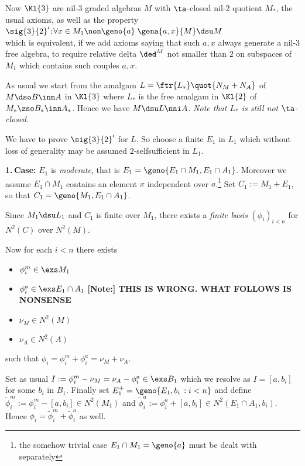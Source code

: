 Now $\Kl{3}$ are nil-$3$ graded algebras $M$ with $\ta$-closed nil-$2$ quotient $M_{*}$,
the usual axioms, as well as the property\\[+1mm]
$\sig{3}{2}^{\prime}$:\quad $\forall x\in M_{1}\non\geno{a}\;\gena{a,x}{M}\dsu M$\\[+2mm]
which is equivalent, if we add axioms saying that such $a,x$ always generate
a nil-$3$ free algebra, to require relative delta $\ded^{M}$ not smaller than $2$ on subspaces of $M_{1}$ which contains such couples $a,x$.

\medskip
As usual we start from the amalgam $L=\ftr{L_{*}}\quot {N_{M}+N_{A}}$ of $M\dso B\inn A$
in $\Kl{3}$ where $L_{*}$ is the free amalgam in $\Kl{2}$ of $M_{*}\zso B_{*}\inn A_{*}$.
Hence we have $M\dsu L \nni A$. {\em Note that $L_{*}$ is still not $\ta$-closed.}

\medskip
We have to prove $\sig{3}{2}^{\prime}$ for $L$. So choose a finite $E_{1}$ in $L_{1}$ which
without loss of generality may be assumed $2$-selfsufficient in $L_{1}$.

\smallskip
{\bf 1.{\,}Case:} $E_{1}$ is {\em moderate}, that is $E_{1}=\geno{E_{1}\cap M_{1},E_{1}\cap A_{1}}$. Moreover we assume $E_{1}\cap M_{1}$ contains an element $x$ independent
over $a$.\footnote{the somehow trivial case $E_{1}\cap M_{1}=\geno{a}$ must be dealt with separately}
Set $C_{1}:=M_{1}+E_{1}$, so that $C_{1}=\geno{M_{1},E_{1}\cap A_{1}}$.

Since $M_{1}\dsu L_{1}$ and $C_{1}$ is finite over $M_{1}$, there exists a {\em finite basis}
$(\phi_{i})_{i<n}$ for $N^{2}(C)$ over $N^{2}(M)$.

Now for each $i<n$ there exists
\begin{itemize}
\item $\phi^{m}_{i}\in\exs M_{1}$
\item $\phi^{a}_{i}\in\exs E_{1}\cap A_{1}$ {\bf [Note:] THIS IS WRONG. WHAT FOLLOWS IS NONSENSE}
\item $\nu_{M}\in N^{2}(M)$
\item $\nu_{A}\in N^{2}(A)$
\end{itemize}
such that $\phi_{i}=\phi^{m}_{i}+\phi^{a}_{i}=\nu_{M}+\nu_{A}$.

Set as usual
$I:=\phi^{m}_{i}-\nu_{M}=\nu_{A}-\phi^{a}_{i}\in\exs B_{1}$ which we resolve
as $I=[a,b_{i}]$ for some $b_{i}$ in $B_{1}$. Finally set $E_{1}^{+}=\geno{E_{1},b_{i}\,:
i<n}$ and define $\tilde\phi ^{m}_{i}:=\phi^{m}_{i}-[a,b_{i}]\in N^{2}(M_{1})$ and
$\tilde\phi ^{a}_{i}:=\phi^{a}_{i}+[a,b_{i}]\in N^{2}(E_{1}\cap A_{1},b_{i})$. Hence $\phi_{i}=\tilde\phi ^{m}_{i}+\tilde\phi ^{a}_{i}$ as well.

